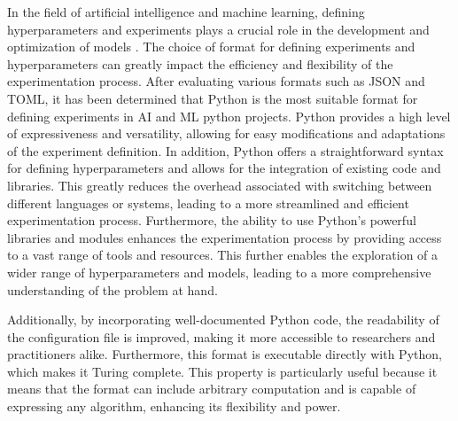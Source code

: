 In the field of artificial intelligence and machine learning, defining hyperparameters and experiments plays a crucial role in the development and optimization of models \cite{wu2019hyperparameter}. The choice of format for defining experiments and hyperparameters can greatly impact the efficiency and flexibility of the experimentation process. After evaluating various formats such as JSON and TOML, it has been determined that Python is the most suitable format for defining experiments in AI and ML python projects. Python provides a high level of expressiveness and versatility, allowing for easy modifications and adaptations of the experiment definition. In addition, Python offers a straightforward syntax for defining hyperparameters and allows for the integration of existing code and libraries. This greatly reduces the overhead associated with switching between different languages or systems, leading to a more streamlined and efficient experimentation process. Furthermore, the ability to use Python's powerful libraries and modules enhances the experimentation process by providing access to a vast range of tools and resources. This further enables the exploration of a wider range of hyperparameters and models, leading to a more comprehensive understanding of the problem at hand.

Additionally, by incorporating well-documented Python code, the readability of the configuration file is improved, making it more accessible to researchers and practitioners alike. Furthermore, this format is executable directly with Python, which makes it Turing complete. This property is particularly useful because it means that the format can include arbitrary computation and is capable of expressing any algorithm, enhancing its flexibility and power.





